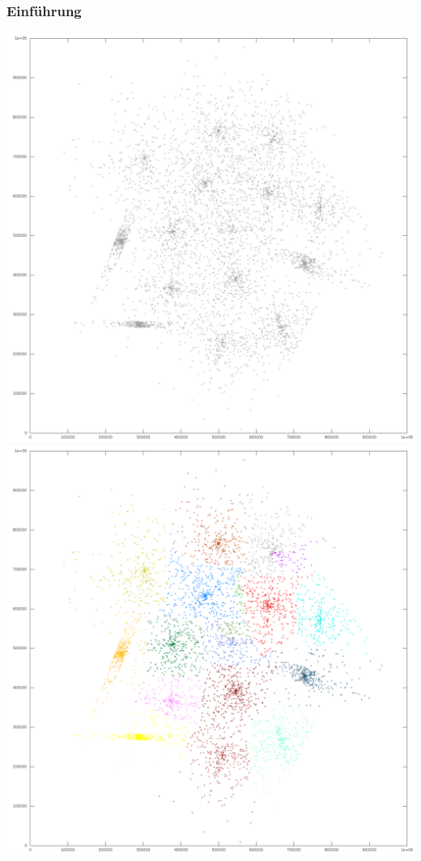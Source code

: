 \documentclass[10pt]{beamer}
\begin{document}
\begin{frame}
	\frametitle{Einf\"uhrung}
	\includegraphics[scale=0.12, keepaspectratio]{../output/pics/s4_black.png}
	\includegraphics[scale=0.12, keepaspectratio]{../output/pics/s4_colored.png}
\end{frame}
\end{document}
